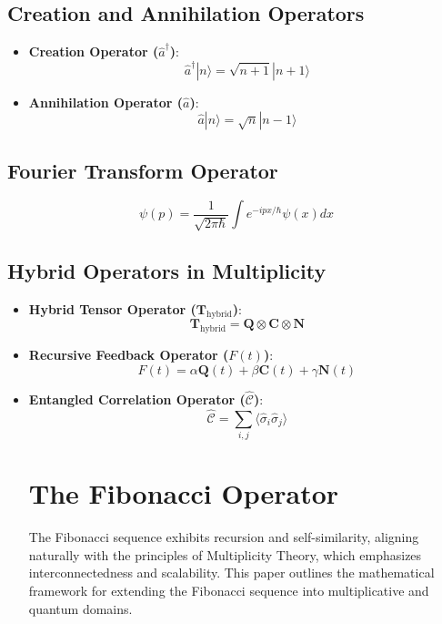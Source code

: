 \documentclass{article}
\theoremstyle{plain}
\begin{document}
\begin{itemize}
\subsection{Creation and Annihilation Operators}
\begin{itemize}
    \item \textbf{Creation Operator (\(\hat{a}^\dagger\))}:
    \[
    \hat{a}^\dagger |n\rangle = \sqrt{n+1} |n+1\rangle
    \]

    \item \textbf{Annihilation Operator (\(\hat{a}\))}:
    \[
    \hat{a} |n\rangle = \sqrt{n} |n-1\rangle
    \]
\end{itemize}

\subsection{Fourier Transform Operator}
\[
\psi(p) = \frac{1}{\sqrt{2\pi \hbar}} \int e^{-ipx/\hbar} \psi(x) dx
\]

\subsection{Hybrid Operators in Multiplicity}
\begin{itemize}
    \item \textbf{Hybrid Tensor Operator (\(\mathbf{T}_{\text{hybrid}}\))}:
    \[
    \mathbf{T}_{\text{hybrid}} = \mathbf{Q} \otimes \mathbf{C} \otimes \mathbf{N}
    \]

    \item \textbf{Recursive Feedback Operator (\(F(t)\))}:
    \[
    F(t) = \alpha \mathbf{Q}(t) + \beta \mathbf{C}(t) + \gamma \mathbf{N}(t)
    \]

    \item \textbf{Entangled Correlation Operator (\(\hat{\mathcal{C}}\))}:
    \[
    \hat{\mathcal{C}} = \sum_{i,j} \langle \hat{\sigma}_i \hat{\sigma}_j \rangle
    \]

\section{The Fibonacci Operator}

The Fibonacci sequence exhibits recursion and self-similarity, aligning naturally with the principles of Multiplicity Theory, which emphasizes interconnectedness and scalability. This paper outlines the mathematical framework for extending the Fibonacci sequence into multiplicative and quantum domains.


\end{itemize}
\end{itemize}
\end{document}
